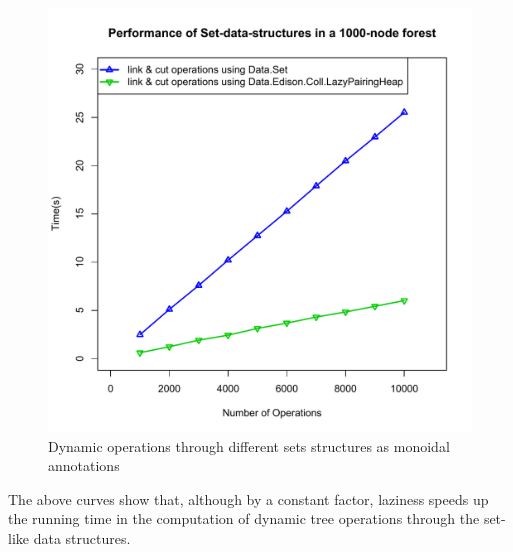 \begin{figure}[H]
\begin{center}
\includegraphics[scale=0.4]{./Images/plotSets} 
\end{center}
\caption{Dynamic operations through different sets structures as monoidal annotations}
\label{fig:plotSets}
\end{figure}

The above curves show that, although by a constant factor, laziness speeds up the running time in the computation of dynamic tree operations through the set-like data structures.

